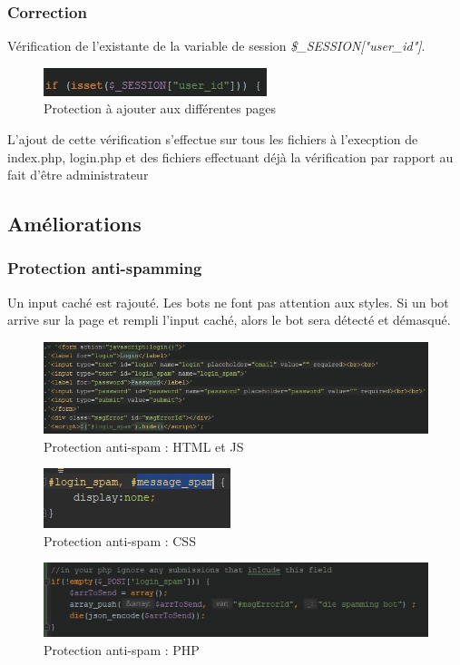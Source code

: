 \documentclass[12pt]{article}
\begin{document}
\subsubsection{Correction}
Vérification de l'existante de la variable de session \textit{\$\_SESSION["user\_id"]}.
\begin{figure}[H]
\centering
\includegraphics[width=\linewidth]{images/protectionPage.jpg}
\caption{Protection à ajouter aux différentes pages}
\end{figure}
L'ajout de cette vérification s'effectue sur tous les fichiers à l'execption de index.php, login.php et des fichiers effectuant déjà la vérification par rapport au fait d'être administrateur

\subsection{Améliorations}
\subsubsection{Protection anti-spamming}
Un input caché est rajouté. Les bots ne font pas attention aux styles. Si un bot arrive sur la page et rempli l'input caché, alors le bot sera détecté et démasqué.

\begin{figure}[H]
\centering
\includegraphics[width=\linewidth]{images/noSpamLoginFormHTMLJS.jpg}
\caption{Protection anti-spam : HTML et JS}
\end{figure}
\begin{figure}[H]
\centering
\includegraphics[width=\linewidth]{images/noSpamLoginFormCSS.jpg}
\caption{Protection anti-spam : CSS}
\end{figure}
\begin{figure}[H]
\centering
\includegraphics[width=\linewidth]{images/noSpamLoginFormPHP.jpg}
\caption{Protection anti-spam : PHP}
\end{figure}
\end{document}
